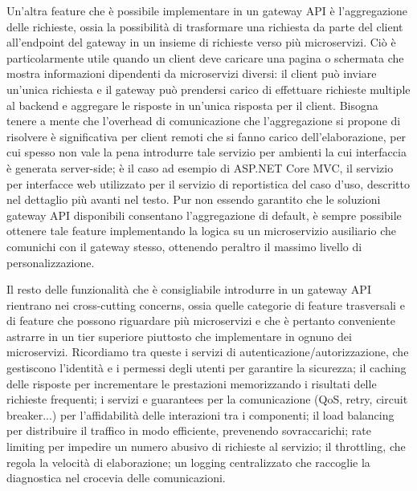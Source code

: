Un'altra feature che è possibile implementare in un gateway API è l'aggregazione delle richieste, ossia la possibilità di trasformare una richiesta da parte del client all'endpoint del gateway in un insieme di richieste verso più microservizi. Ciò è particolarmente utile quando un client deve caricare una pagina o schermata che mostra informazioni dipendenti da microservizi diversi: il client può inviare un'unica richiesta e il gateway può prendersi carico di effettuare richieste multiple al backend e aggregare le risposte in un'unica risposta per il client.
Bisogna tenere a mente che l'overhead di comunicazione che l'aggregazione si propone di risolvere è significativa per client remoti che si fanno carico dell'elaborazione, per cui spesso non vale la pena introdurre tale servizio per ambienti la cui interfaccia è generata server-side; è il caso ad esempio di ASP.NET Core MVC, il servizio per interfacce web utilizzato per il servizio di reportistica del caso d'uso, descritto nel dettaglio più avanti nel testo.
Pur non essendo garantito che le soluzioni gateway API disponibili consentano l'aggregazione di default, è sempre possibile ottenere tale feature implementando la logica su un microservizio ausiliario che comunichi con il gateway stesso, ottenendo peraltro il massimo livello di personalizzazione.

Il resto delle funzionalità che è consigliabile introdurre in un gateway API rientrano nei cross-cutting concerns, ossia quelle categorie di feature trasversali e di feature che possono riguardare più microservizi e che è pertanto conveniente astrarre in un tier superiore piuttosto che implementare in ognuno dei microservizi. Ricordiamo tra queste i servizi di autenticazione/autorizzazione, che gestiscono l'identità e i permessi degli utenti per garantire la sicurezza; il caching delle risposte per incrementare le prestazioni memorizzando i risultati delle richieste frequenti; i servizi e guarantees per la comunicazione (QoS, retry, circuit breaker...) per l'affidabilità delle interazioni tra i componenti; il load balancing per distribuire il traffico in modo efficiente, prevenendo sovraccarichi; rate limiting per impedire un numero abusivo di richieste al servizio; il throttling, che regola la velocità di elaborazione; un logging centralizzato che raccoglie la diagnostica nel crocevia delle comunicazioni.\cite[44-45]{.NET_Microservices}

